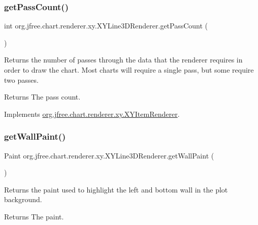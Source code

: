 \subsubsection{\texorpdfstring{get\+Pass\+Count()}{getPassCount()}}
{\footnotesize\ttfamily int org.\+jfree.\+chart.\+renderer.\+xy.\+X\+Y\+Line3\+D\+Renderer.\+get\+Pass\+Count (\begin{DoxyParamCaption}{ }\end{DoxyParamCaption})}

Returns the number of passes through the data that the renderer requires in order to draw the chart. Most charts will require a single pass, but some require two passes.

\begin{DoxyReturn}{Returns}
The pass count. 
\end{DoxyReturn}


Implements \mbox{\hyperlink{interfaceorg_1_1jfree_1_1chart_1_1renderer_1_1xy_1_1_x_y_item_renderer_afe42489776da2a4c7e64838382bbaea1}{org.\+jfree.\+chart.\+renderer.\+xy.\+X\+Y\+Item\+Renderer}}.

\mbox{\label{classorg_1_1jfree_1_1chart_1_1renderer_1_1xy_1_1_x_y_line3_d_renderer_a652c8812a2775b97b7d8e3b677031a65}} 
\subsubsection{\texorpdfstring{get\+Wall\+Paint()}{getWallPaint()}}
{\footnotesize\ttfamily Paint org.\+jfree.\+chart.\+renderer.\+xy.\+X\+Y\+Line3\+D\+Renderer.\+get\+Wall\+Paint (\begin{DoxyParamCaption}{ }\end{DoxyParamCaption})}

Returns the paint used to highlight the left and bottom wall in the plot background.

\begin{DoxyReturn}{Returns}
The paint. 
\end{DoxyReturn}
\mbox{\label{classorg_1_1jfree_1_1chart_1_1renderer_1_1xy_1_1_x_y_line3_d_renderer_a54f46c28c7bdc128e08b4281efc8d3e5}} 
